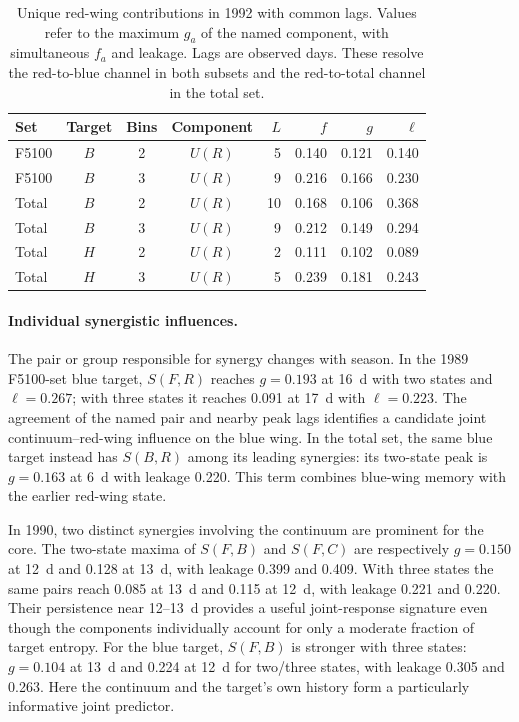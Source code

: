\documentclass[fleqn,usenatbib]{mnras}
\newenvironment{SURDtable}{\begin{table}}{\end{table}}
\begin{document}
\begin{SURDtable}
\centering
\caption{Unique red-wing contributions in 1992 with common lags. Values refer to the maximum $g_a$ of the named component, with simultaneous $f_a$ and leakage. Lags are observed days. These resolve the red-to-blue channel in both subsets and the red-to-total channel in the total set.}
\label{tab:directed_1992}
\small
\begin{tabular}{lcccrrrr}
\toprule
Set & Target & Bins & Component & $L$ & $f$ & $g$ & $\ell$ \\
\midrule
F5100 & $B$ & 2 & $U(R)$ & 5 & 0.140 & 0.121 & 0.140 \\
F5100 & $B$ & 3 & $U(R)$ & 9 & 0.216 & 0.166 & 0.230 \\
Total & $B$ & 2 & $U(R)$ & 10 & 0.168 & 0.106 & 0.368 \\
Total & $B$ & 3 & $U(R)$ & 9 & 0.212 & 0.149 & 0.294 \\
Total & $H$ & 2 & $U(R)$ & 2 & 0.111 & 0.102 & 0.089 \\
Total & $H$ & 3 & $U(R)$ & 5 & 0.239 & 0.181 & 0.243 \\
\bottomrule
\end{tabular}
\end{SURDtable}


\paragraph*{Individual synergistic influences.}
The pair or group responsible for synergy changes with season. In the 1989 F5100-set blue target, $S(F,R)$ reaches $g=0.193$ at 16~d with two states and $\ell=0.267$; with three states it reaches 0.091 at 17~d with $\ell=0.223$. The agreement of the named pair and nearby peak lags identifies a candidate joint continuum--red-wing influence on the blue wing. In the total set, the same blue target instead has $S(B,R)$ among its leading synergies: its two-state peak is $g=0.163$ at 6~d with leakage 0.220. This term combines blue-wing memory with the earlier red-wing state.

In 1990, two distinct synergies involving the continuum are prominent for the core. The two-state maxima of $S(F,B)$ and $S(F,C)$ are respectively $g=0.150$ at 12~d and 0.128 at 13~d, with leakage 0.399 and 0.409. With three states the same pairs reach 0.085 at 13~d and 0.115 at 12~d, with leakage 0.221 and 0.220. Their persistence near 12--13~d provides a useful joint-response signature even though the components individually account for only a moderate fraction of target entropy. For the blue target, $S(F,B)$ is stronger with three states: $g=0.104$ at 13~d and 0.224 at 12~d for two/three states, with leakage 0.305 and 0.263. Here the continuum and the target's own history form a particularly informative joint predictor.
\end{document}
